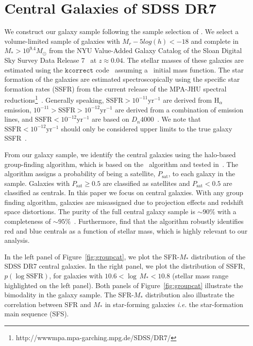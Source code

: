 \documentclass[12pt, letterpaper, preprint, tighten]{aastex}
\begin{document}
\section{Central Galaxies of SDSS DR7} \label{sec:sdss}
We construct our galaxy sample following the sample selection of \cite{tinker2011}. 
We select a volume-limited sample of galaxies with $M_r −5 log(h) < −18$ and complete in
$M_* > 10^{9.4} M_\odot$ from the NYU Value-Added Galaxy Catalog \citep[VAGC;][]{blanton2005}
of the Sloan Digital Sky Survey Data Release 7~\citep[SDSS DR7;][]{abazajian2009} at 
$z \approx 0.04$. The stellar masses of these galaxies are estimated using the
$\mathtt{kcorrect}$ code~\citep{blanton2007} assuming a~\cite{chabrier2003} initial
mass function. The star formation of the galaxies are estimated spectroscopically using the
specific star formation rates (SSFR) from the current release of the MPA-JHU spectral 
reductions\footnote{http://wwwmpa.mpa-garching.mpg.de/SDSS/DR7/}~\citep{brinchmann2004}.
Generally speaking, $\mathrm{SSFR} > 10^{-11}\mathrm{yr}^{-1}$ are derived from 
$\mathrm{H}_\alpha$ emission, $10^{-11} > \mathrm{SSFR} > 10^{-12}\mathrm{yr}^{-1}$
are derived from a combination of emission lines, and $\mathrm{SSFR} < 10^{-12}\mathrm{yr}^{-1}$
are based on $D_n 4000$~\citep[see discussion in][]{wetzel2013}. We note that 
$\mathrm{SSFR} < 10^{-12}\mathrm{yr}^{-1}$ should only be considered upper limits 
to the true galaxy SSFR~\citep{salim2007}.

From our galaxy sample, we identify the central galaxies using the \cite{tinker2011} halo-based 
group-finding algorithm, which is based on the~\cite{yang2005} algorithm and tested 
in~\cite{campbell2015}. The algorithm assigns a probability of being a satellite,
$P_\mathrm{sat}$, to each galaxy in the sample. Galaxies with $P_\mathrm{sat} \geq 0.5$ 
are classified as satellites and $P_\mathrm{sat} < 0.5$ are classified as centrals. 
In this paper we focus on central galaxies. With any group finding algorithm, galaxies are 
misassigned due to projection effects and redshift space distortions. The purity 
of the full central galaxy sample is $\sim 90\%$ with a completeness of $\sim 95\%$~\citep{tinker2017}.
Furthermore, \cite{campbell2015} find that the algorithm robustly identifies red and blue centrals
as a function of stellar mass, which is highly relevant to our analysis.  

In the left panel of Figure~\ref{fig:groupcat}, we plot the SFR-$M_*$ distribution of
the SDSS DR7 central galaxies. In the right panel, we plot the distribution of SSFR, 
$p(\log \mathrm{SSFR})$, for galaxies with $10.6 < \log \,M_* < 10.8$ (stellar mass range 
highlighted on the left panel). Both panels of Figure~\ref{fig:groupcat} illustrate the 
bimodality in the galaxy sample. The SFR-$M_*$ distribution also illustrate the correlation
between SFR and $M_*$ in star-forming galaxies \emph{i.e.} the star-formation main sequence 
(SFS).
\end{document}
